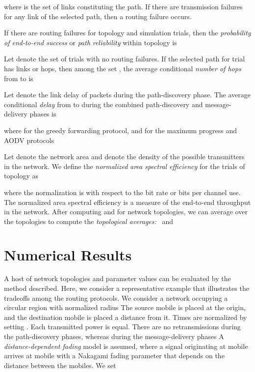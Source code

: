 \documentclass[conference]{IEEEtran}
\begin{document}
where  is the set of links constituting the path.
If there are  transmission failures for any link of the
selected path, then a routing failure occurs.


If there are  routing failures for topology  and  simulation
trials, then the \emph{probability of end-to-end success} or \emph{path}
\emph{reliability} within topology  is


Let  denote the set of
 trials with no routing failures. If the selected path for trial  has  links or hops, then among the set
, the average conditional
\emph{number of hops}
from  to  is


Let  denote the link delay of packets during the path-discovery phase. The average conditional
\emph{delay} from  to 
during the combined path-discovery and
message-delivery phases is

where  for the greedy forwarding protocol, and  for the maximum progress and AODV protocols

Let  denote the network area and  denote the density of
the possible transmitters in the network. We define the \emph{normalized}
\emph{area spectral efficiency} for the  trials of topology  as

where the normalization is with respect to the bit rate or bits per channel use. The normalized area spectral
efficiency is a measure of the end-to-end throughput in the network. After
computing    and  for 
network topologies, we can average over the topologies to compute the \emph{topological averages: }\  and 


\section{Numerical Results}

A host of network topologies and parameter values can be evaluated by the
method described. Here, we consider a representative example that illustrates
the tradeoffs among the routing protocols. We consider a network occupying a
circular region with normalized radius  The source mobile is
placed at the origin, and the destination mobile is placed a distance
 from it. Times are normalized by setting . Each
transmitted power  is equal. There are no retransmissions during the
path-discovery phases, whereas  during the message-delivery phases
A \emph{distance-dependent fading} model is assumed, where a signal
originating at mobile  arrives at mobile  with a Nakagami fading
parameter  that depends on the distance between the mobiles. We set
\end{document}
